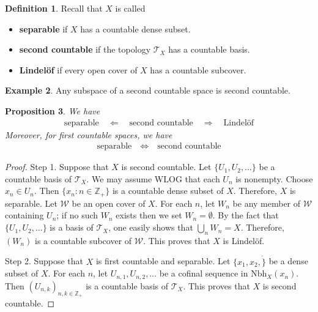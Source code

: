 \documentclass[12pt,b5paper,notitlepage]{article}
\theoremstyle{definition}
\newtheorem{df}{Definition}[subsection]
\newtheorem{eg}[df]{Example}
\theoremstyle{plain}
\newtheorem{pp}[df]{Proposition}
\newcommand{\Zbb}{\mathbb Z}
\newcommand{\Nbh}{\mathrm{Nbh}}
\newcommand{\MW}{\mathcal W}
\newcommand{\MT}{\mathcal T}
\numberwithin{equation}{section}
\begin{document}
\begin{df}
Recall that $X$ is called
\begin{itemize}
\item \textbf{separable}  if $X$ has a countable dense subset.
\item \textbf{second countable}  if the topology $\MT_X$ has a countable basis.
\item \textbf{Lindel\"of}  if every open cover of $X$ has a countable subcover. 
\end{itemize}
\end{df}

















\begin{eg}
Any subspace of a second countable space is second countable.
\end{eg}


\begin{pp}\label{lb220}
We have
\begin{align*}
\text{separable}\quad\Longleftarrow\quad\text{second countable}\quad\Longrightarrow\quad\text{Lindel\"of}
\end{align*}
Moreover, for first countable spaces, we have
\begin{align*}
\text{separable}\quad\Longleftrightarrow\quad\text{second countable}
\end{align*}
\end{pp}


\begin{proof}
Step 1. Suppose that $X$ is second countable. Let $\{U_1,U_2,\dots\}$ be a countable basis of $\MT_X$. We may assume WLOG that each $U_n$ is nonempty. Choose $x_n\in U_n$. Then $\{x_n:n\in\Zbb_+\}$ is a countable dense subset of $X$. Therefore, $X$ is separable. Let $\MW$ be an open cover of $X$. For each $n$, let $W_n$ be any member of $\MW$ containing $U_n$; if no such $W_n$ exists then we set $W_n=\emptyset$. By the fact that $\{U_1,U_2,\dots\}$ is a basis of $\MT_X$, one easily shows that $\bigcup_nW_n=X$. Therefore, $(W_n)$ is a countable subcover of $\MW$. This proves that $X$ is Lindel\"of.

Step 2. Suppose that $X$ is first countable and separable. Let $\{x_1,x_2,\dot\}$ be a dense subset of $X$. For each $n$, let $U_{n,1},U_{n,2},\dots$ be a cofinal sequence in $\Nbh_X(x_n)$. Then $(U_{n,k})_{n,k\in\Zbb_+}$ is a countable basis of $\MT_X$. This proves that $X$ is second countable.
\end{proof}
\end{document}
